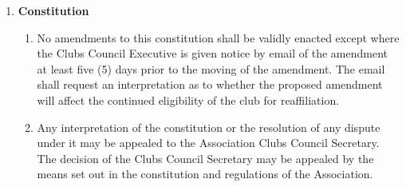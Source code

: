 \documentclass{article}
\begin{document}
\begin{enumerate}[label=\textbf{\arabic*}]
    \item \textbf{Constitution}
    \begin{enumerate}[label=6.\arabic*]
        \item No amendments to this constitution shall be validly enacted except where the Clubs Council Executive is given notice by email of the amendment at least five (5) days prior to the moving of the amendment. The email shall request an interpretation as to whether the proposed amendment will affect the continued eligibility of the club for reaffiliation.
        \item Any interpretation of the constitution or the resolution of any dispute under it may be appealed to the Association Clubs Council Secretary. The decision of the Clubs Council Secretary may be appealed by the means set out in the constitution and regulations of the Association.
    \end{enumerate}

\end{enumerate}
\end{document}
